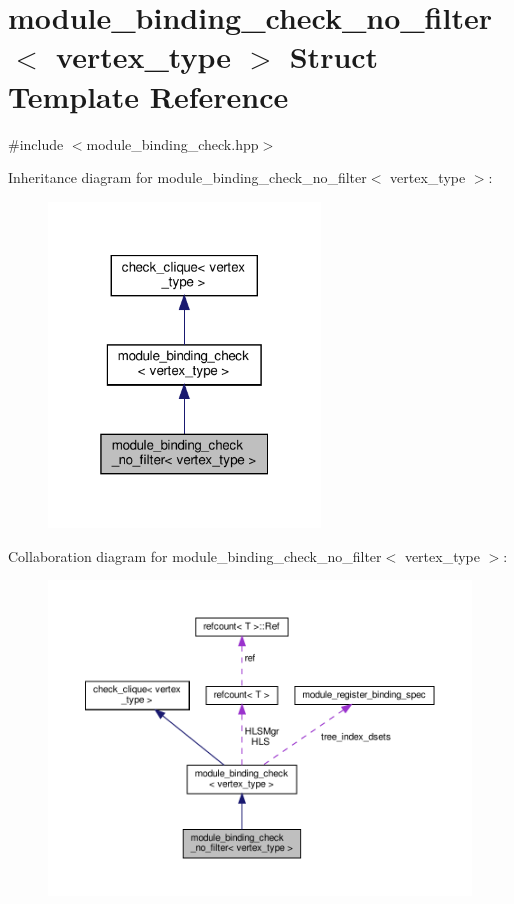 \hypertarget{structmodule__binding__check__no__filter}{}\section{module\+\_\+binding\+\_\+check\+\_\+no\+\_\+filter$<$ vertex\+\_\+type $>$ Struct Template Reference}
\label{structmodule__binding__check__no__filter}


{\ttfamily \#include $<$module\+\_\+binding\+\_\+check.\+hpp$>$}



Inheritance diagram for module\+\_\+binding\+\_\+check\+\_\+no\+\_\+filter$<$ vertex\+\_\+type $>$\+:
\nopagebreak
\begin{figure}[H]
\begin{center}
\leavevmode
\includegraphics[width=205pt]{d7/d0f/structmodule__binding__check__no__filter__inherit__graph}
\end{center}
\end{figure}


Collaboration diagram for module\+\_\+binding\+\_\+check\+\_\+no\+\_\+filter$<$ vertex\+\_\+type $>$\+:
\nopagebreak
\begin{figure}[H]
\begin{center}
\leavevmode
\includegraphics[width=350pt]{d5/d93/structmodule__binding__check__no__filter__coll__graph}
\end{center}
\end{figure}
